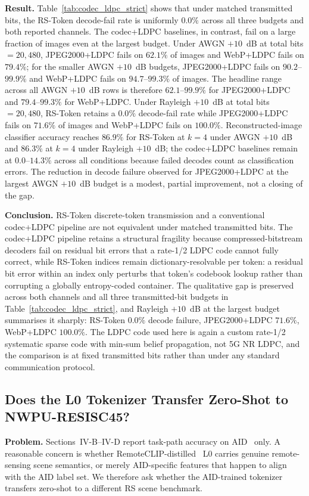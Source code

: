 \documentclass[lettersize,journal]{IEEEtran}
\begin{document}
\textbf{Result.} Table~\ref{tab:codec_ldpc_strict} shows that under matched transmitted bits, the RS-Token decode-fail rate is uniformly $0.0\%$ across all three budgets and both reported channels. The codec+LDPC baselines, in contrast, fail on a large fraction of images even at the largest budget. Under AWGN $+10$~dB at total bits $=20{,}480$, JPEG2000+LDPC fails on $62.1\%$ of images and WebP+LDPC fails on $79.4\%$; for the smaller AWGN $+10$~dB budgets, JPEG2000+LDPC fails on $90.2$--$99.9\%$ and WebP+LDPC fails on $94.7$--$99.3\%$ of images. The headline range across all AWGN $+10$~dB rows is therefore $62.1$--$99.9\%$ for JPEG2000+LDPC and $79.4$--$99.3\%$ for WebP+LDPC. Under Rayleigh $+10$~dB at total bits $=20{,}480$, RS-Token retains a $0.0\%$ decode-fail rate while JPEG2000+LDPC fails on $71.6\%$ of images and WebP+LDPC fails on $100.0\%$. Reconstructed-image classifier accuracy reaches $86.9\%$ for RS-Token at $k=4$ under AWGN $+10$~dB and $86.3\%$ at $k=4$ under Rayleigh $+10$~dB; the codec+LDPC baselines remain at $0.0$--$14.3\%$ across all conditions because failed decodes count as classification errors. The reduction in decode failure observed for JPEG2000+LDPC at the largest AWGN $+10$~dB budget is a modest, partial improvement, not a closing of the gap.

\textbf{Conclusion.} RS-Token discrete-token transmission and a conventional codec+LDPC pipeline are not equivalent under matched transmitted bits. The codec+LDPC pipeline retains a structural fragility because compressed-bitstream decoders fail on residual bit errors that a rate-1/2 LDPC code cannot fully correct, while RS-Token indices remain dictionary-resolvable per token: a residual bit error within an index only perturbs that token's codebook lookup rather than corrupting a globally entropy-coded container. The qualitative gap is preserved across both channels and all three transmitted-bit budgets in Table~\ref{tab:codec_ldpc_strict}, and Rayleigh $+10$~dB at the largest budget summarises it sharply: RS-Token $0.0\%$ decode failure, JPEG2000+LDPC $71.6\%$, WebP+LDPC $100.0\%$. The LDPC code used here is again a custom rate-1/2 systematic sparse code with min-sum belief propagation, not 5G NR LDPC, and the comparison is at fixed transmitted bits rather than under any standard communication protocol.

\subsection{Does the L0 Tokenizer Transfer Zero-Shot to NWPU-RESISC45?}
\textbf{Problem.} Sections~IV-B--IV-D report task-path accuracy on AID~\cite{xia2017aid} only. A reasonable concern is whether RemoteCLIP-distilled~\cite{liu2024remoteclip} L0 carries genuine remote-sensing scene semantics, or merely AID-specific features that happen to align with the AID label set. We therefore ask whether the AID-trained tokenizer transfers zero-shot to a different RS scene benchmark.
\end{document}
